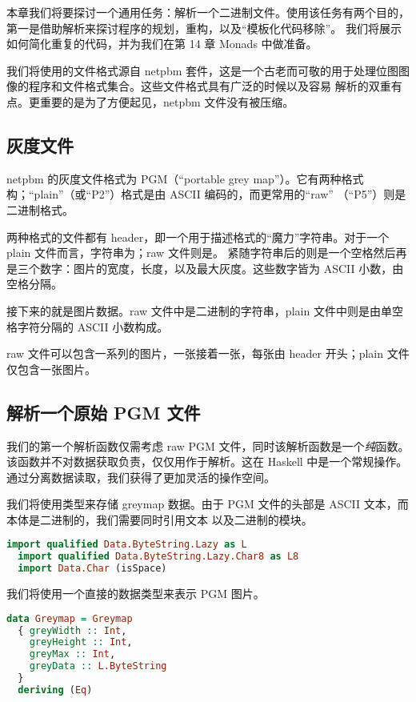 \documentclass[./main.tex]{subfiles}
\begin{document}
本章我们将要探讨一个通用任务：解析一个二进制文件。使用该任务有两个目的，第一是借助解析来探讨程序的规划，重构，以及“模板化代码移除”。
我们将展示如何简化重复的代码，并为我们在第 14 章 Monads 中做准备。

我们将使用的文件格式源自 netpbm 套件，这是一个古老而可敬的用于处理位图图像的程序和文件格式集合。这些文件格式具有广泛的时候以及容易
解析的双重有点。更重要的是为了方便起见，netpbm 文件没有被压缩。

\subsection*{灰度文件}

netpbm 的灰度文件格式为 PGM（“portable grey map”）。它有两种格式构；“plain”（或“P2”）格式是由 ASCII 编码的，而更常用的“raw”
（“P5”）则是二进制格式。

两种格式的文件都有 header，即一个用于描述格式的“魔力”字符串。对于一个 plain 文件而言，字符串为；raw 文件则是。
紧随字符串后的则是一个空格然后再是三个数字：图片的宽度，长度，以及最大灰度。这些数字皆为 ASCII 小数，由空格分隔。

接下来的就是图片数据。raw 文件中是二进制的字符串，plain 文件中则是由单空格字符分隔的 ASCII 小数构成。

raw 文件可以包含一系列的图片，一张接着一张，每张由 header 开头；plain 文件仅包含一张图片。

\subsection*{解析一个原始 PGM 文件}

我们的第一个解析函数仅需考虑 raw PGM 文件，同时该解析函数是一个\textit{纯}函数。该函数并不对数据获取负责，仅仅用作于解析。这在
Haskell 中是一个常规操作。通过分离数据读取，我们获得了更加灵活的操作空间。

我们将使用类型来存储 greymap 数据。由于 PGM 文件的头部是 ASCII 文本，而本体是二进制的，我们需要同时引用文本
以及二进制的模块。

\begin{lstlisting}[language=Haskell]
  import qualified Data.ByteString.Lazy as L
  import qualified Data.ByteString.Lazy.Char8 as L8
  import Data.Char (isSpace)
\end{lstlisting}

我们将使用一个直接的数据类型来表示 PGM 图片。

\begin{lstlisting}[language=Haskell]
  data Greymap = Greymap
  { greyWidth :: Int,
    greyHeight :: Int,
    greyMax :: Int,
    greyData :: L.ByteString
  }
  deriving (Eq)
\end{lstlisting}
\end{document}
